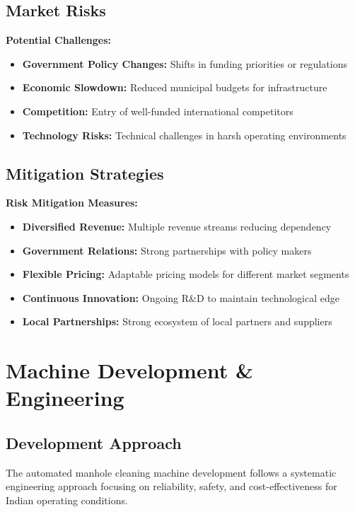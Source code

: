 \documentclass[11pt,a4paper]{article}
\begin{document}
\subsection{Market Risks}
\begin{warning}
\textbf{Potential Challenges:}
\begin{itemize}
    \item \textbf{Government Policy Changes:} Shifts in funding priorities or regulations
    \item \textbf{Economic Slowdown:} Reduced municipal budgets for infrastructure
    \item \textbf{Competition:} Entry of well-funded international competitors
    \item \textbf{Technology Risks:} Technical challenges in harsh operating environments
\end{itemize}
\end{warning}

\subsection{Mitigation Strategies}
\begin{success}
\textbf{Risk Mitigation Measures:}
\begin{itemize}
    \item \textbf{Diversified Revenue:} Multiple revenue streams reducing dependency
    \item \textbf{Government Relations:} Strong partnerships with policy makers
    \item \textbf{Flexible Pricing:} Adaptable pricing models for different market segments
    \item \textbf{Continuous Innovation:} Ongoing R\&D to maintain technological edge
    \item \textbf{Local Partnerships:} Strong ecosystem of local partners and suppliers
\end{itemize}
\end{success}

\section{Machine Development \& Engineering}

\subsection{Development Approach}
The automated manhole cleaning machine development follows a systematic engineering approach focusing on reliability, safety, and cost-effectiveness for Indian operating conditions.
\end{document}
